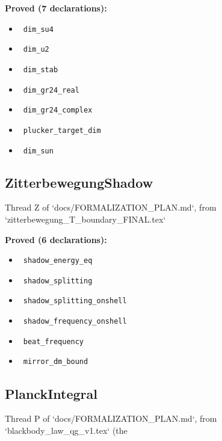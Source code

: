 \documentclass{report}
\theoremstyle{definition}
\begin{document}
\begin{itemize}
\begin{itemize}
\noindent\textbf{Proved (7 declarations):}
\begin{itemize}
  \item {}\leanok\ \texttt{dim\_su4}
  \item {}\leanok\ \texttt{dim\_u2}
  \item {}\leanok\ \texttt{dim\_stab}
  \item {}\leanok\ \texttt{dim\_gr24\_real}
  \item {}\leanok\ \texttt{dim\_gr24\_complex}
  \item {}\leanok\ \texttt{plucker\_target\_dim}
  \item {}\leanok\ \texttt{dim\_sun}
\end{itemize}

\subsection{ZitterbewegungShadow}
Thread Z of `docs/FORMALIZATION\_PLAN.md`, from `zitterbewegung\_T\_boundary\_FINAL.tex`

\noindent\textbf{Proved (6 declarations):}
\begin{itemize}
  \item {}\leanok\ \texttt{shadow\_energy\_eq}
  \item {}\leanok\ \texttt{shadow\_splitting}
  \item {}\leanok\ \texttt{shadow\_splitting\_onshell}
  \item {}\leanok\ \texttt{shadow\_frequency\_onshell}
  \item {}\leanok\ \texttt{beat\_frequency}
  \item {}\leanok\ \texttt{mirror\_dm\_bound}
\end{itemize}

\subsection{PlanckIntegral}
Thread P of `docs/FORMALIZATION\_PLAN.md`, from `blackbody\_law\_qg\_v1.tex` (the


\end{itemize}
\end{itemize}
\end{document}

